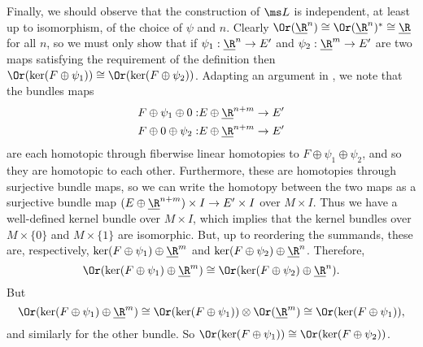Finally, we should observe that the construction of $\ms L$ is independent, at least up to isomorphism, of the choice of $\psi$ and $n$. Clearly $\Or(\underline{\R}^n)\cong \Or(\underline{\R}^n)^*\cong \underline{\R}$ for all $n$, so we must only show that if $\psi_1:\underline{\R}^n\to E'$ and $\psi_2:\underline{\R}^m\to E'$ are two maps satisfying the requirement of the definition then $\Or(\ker(F\oplus \psi_1))\cong \Or(\ker(F\oplus \psi_2))$. Adapting an argument in \cite[Section 5.1.3]{DoKr90}, we note that the bundles maps
\begin{align*}
F\oplus \psi_1\oplus 0: &E\oplus \underline{\R}^{n+m}\to E'\\
F\oplus 0\oplus \psi_2: &E\oplus \underline{\R}^{n+m}\to E'  
\end{align*} 
are each homotopic through fiberwise linear homotopies to $F\oplus \psi_1\oplus \psi_2$, and so they are homotopic to each other. Furthermore, these are homotopies through surjective bundle maps, so we can write the homotopy between the two maps as a surjective bundle map  $(E\oplus \underline{\R}^{n+m})\times I\to E'\times I$ over $M\times I$. Thus we have a well-defined kernel bundle over $M\times I$, which implies that the kernel bundles over $M\times \{0\}$ and $M\times \{1\}$ are isomorphic. But, up to reordering the summands, these are, respectively, $\ker(F\oplus \psi_1)\oplus \underline{\R}^m$ and $\ker(F\oplus \psi_2)\oplus \underline{\R}^n$. Therefore,
$$\Or(\ker(F\oplus \psi_1)\oplus \underline{\R}^m)\cong \Or(\ker(F\oplus \psi_2)\oplus \underline{\R}^n).$$
But $$\Or(\ker(F\oplus \psi_1)\oplus \underline{\R}^m)\cong \Or(\ker(F\oplus \psi_1))\otimes \Or(\underline{\R}^m)\cong \Or(\ker(F\oplus \psi_1)),$$
and similarly for the other bundle. So $\Or(\ker(F\oplus \psi_1))\cong \Or(\ker(F\oplus \psi_2))$. 


